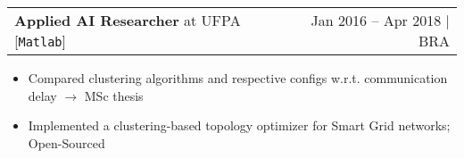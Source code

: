 \documentclass[a4paper,11pt]{article}
\makeatletter
\newcommand{\myHrefIcn}[2]{#2 \href{#1}{\scriptsize{\faExternalLink{}}}}
\newcommand{\first}{1\textsuperscript{st}}
\newcommand{\resumeItem}[2]{
  \item\small{
    \textbf{#1}{: #2 \vspace{-2pt}}
  }
}
\newcommand{\resumeItemCustom}[1]{
  \item\small{#1 \vspace{-2pt}}
}
\newcommand{\resumeJobSubheadingD}[7]{
  \vspace{0pt}\item
    \begin{tabular*}{0.97\textwidth}{l@{\extracolsep{\fill}}r}
      \textbf{#4} at \myHrefIcn{#1}{#2} \hspace{3pt} [\small \texttt{#6}] & {\small #5}
    \end{tabular*}\vspace{-6pt}
}
\newcommand{\resumeItemListStart}{\begin{itemize}}
\newcommand{\resumeItemListEnd}{\end{itemize}\vspace{-5pt}}
\makeatother
\begin{document}

    \resumeJobSubheadingD
      {http://www.lpo.ufpa.br/}{UFPA}{Electrical Engineering faculty lab}%
      {Applied AI Researcher}%
      {Jan 2016 -- Apr 2018 $\vert$ BRA}
      {Matlab}%
      {Smart power grid communication optimization research through cell positioning - Related to MSc Thesis}
      \resumeItemListStart
\resumeItemCustom{Compared clustering algorithms and %
respective configs w.r.t. communication delay %
$\rightarrow$ \myHrefIcn{http://www.repositorio.ufpa.br/jspui/bitstream/2011/10013/1/Dissertacao_ClusteringDrivenEquipament.pdf}{MSc thesis}}%
\resumeItemCustom{Implemented a clustering-based topology optimizer for Smart Grid networks; %
\myHrefIcn{https://github.com/vrbsky/network-model}{Open-Sourced}}

      \resumeItemListEnd
\end{document}
